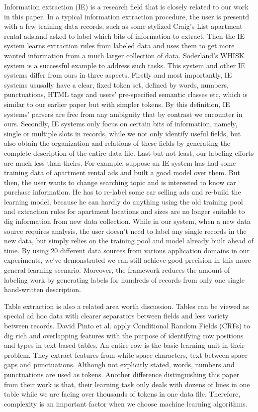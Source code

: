 Information extraction (IE) is a research field that is closely related to
our work in this paper. In a typical information extraction procedure,
the user is presentd with a few training data records, such as
some stylized Craig's List apartment rental ads,and asked to label
which bits of information to extract. Then the IE system learns
extraction rules from labeled data and uses them to get more wanted
information from a much larger collection of data. Soderland's WHISK
system \cite{soderland:whisk} is a successful example to address such
tasks. This system and other IE systems differ from ours in three aspects. Firstly and
most importantly, IE systems ususally have a clear, fixed token set, defined by
words, numbers, punctuations, HTML tags and users' pre-specified
semantic classes etc, which is similar to our earlier paper
\cite{fisher+:dirttoshovels} but with simpler tokens. By this
definition, IE systems' parsers are free from any ambiguity that by contrast we
encounter in ours. Secondly, IE systems only focus on certain bits of
information, namely, single or multiple slots in records, while we not
only identify useful fields, but also obtain the organization and
relations of these fields by generating the complete description of
the entire data file. Last but not least, our labeling efforts are
much less than theirs. For example, suppose an IE system has had some
training data of apartment rental ads and built a good model over
them. But then, the user wants to change searching topic and is
interested to know car purchase information. He has to re-label some
car selling ads and re-build the learning model, because he can hardly
do anything using the old training pool and extraction rules for
apartment locations and sizes are no longer suitable to dig
information from new data collection. While in our system, when a new
data source requires analysis, the user doesn't need to label any single records in
the new data, but simply relies on the training pool and model already
built ahead of time. By using 20 different data sources from various
application domains in our experiments, we've demonstrated we can
still achieve good precision in this more general learning scenario. Moreover, the
\pads{} framework reduces the amount of labeling work by generating
labels for hundreds of records from only one single hand-written description.

Table extraction is also a related area worth discussion. Tables can
be viewed as special ad hoc data with clearer separators between
fields and less variety between records. David Pinto et
al. \cite{Pinto+:texttables} apply
Conditional Random Fields (CRFs) to dig rich and overlapping features
with the purpose of identifying row positions and types in text-based
tables. An entire row is the basic learning unit in their
problem. They extract features from white space characters,
text between space gaps and punctuations. Although not explicitly
stated, words, numbers and punctuations are used as tokens. Another
difference distinguishing this paper from their work is that, their
learning task only deals with dozens of lines in one table while we are
facing over thousands of tokens in one data file. Therefore,
complexity is an important factor when we choose machine learning algorithms. 

